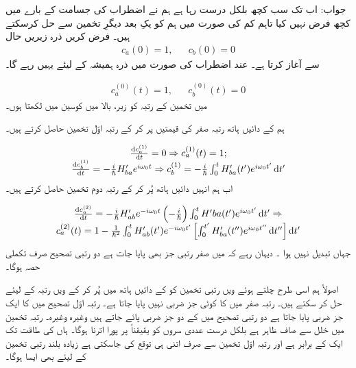 جواب:  
اب تک سب کچھ بلکل درست رہا ہے ہم نے اضطراب کی جسامت کے بارے میں کچھ فرض نہیں کیا تاہم کم  کی صورت میں ہم  کو یکِ بعد دیگرِ تخمین سے حل کرسکتے ہیں۔ فرض کریں ذرہ زیریں حال
\begin{align}
	c_a(0)=1,&&c_b(0)=0
\end{align}
سے آغاز کرتا ہے۔ عند اضطراب کی صورت میں ذرہ ہمیشہ کے لیئے یہیں رہے گا۔

\begin{align}
	c^{(0)}_a(t)=1,&&c_b^{(0)}(t)=0
\end{align}
میں تخمین کے رتبہ کو زیر، بالا میں کوسین میں لکھتا ہوں۔

ہم  کے دائیں ہاتھ رتبہ صفر کی قیمتیں پر کر کے رتبہ اوّل تخمین حاصل کرتے ہیں۔

\begin{align}
	\begin{matrix}
		\frac{\dif c_a^{(1)}}{\dif t}=0\Rightarrow c_a^{(1)}(t)=1; \\
		\frac{\dif c_b^{(1)}}{\dif t}=-\frac{i}{\hslash}H'_{ba}e^{i\omega_0t}\Rightarrow c_b^{(1)}=-\frac{i}{\hslash}\int_{0}^{t}H'_{ba}(t')e^{i\omega_0t'}\dif t'
	\end{matrix} 
\end{align}
اب ہم انہیں دائیں ہاتھ پُر کر کے رتبہ دوم تخمین حاصل کرتے ہیں۔

\begin{align}
	\begin{matrix}
		\frac{\dif c_a^{(2)}}{\dif t}=-\frac{i}{\hslash}H'_{ab}e^{-i\omega_0t}\left(-\frac{i}{\hslash}\right)\int_{0}^{t}H'{ba}(t')e^{i\omega_0t'}\dif t'\Rightarrow \\
		c_a^{(2)}(t)=1-\frac{1}{\hslash^2}\int_{0}^{t}H'_{ab}(t')e^{-i\omega_0t'}\left[\int_{0}^{t'}H'_{ba}(t'')e^{i\omega_0t''}\dif t''\right]\dif t'
	\end{matrix}
\end{align}
جہاں  تبدیل نہیں ہوا ۔ دیہان رہے کہ  میں صفر رتبی جز بھی پایا جات ہے دو رتبی تصحیح صرف تکملی حصہ ہوگا۔

اصولاً ہم اسی طرح چلتے ہوئے ویں رتبی تخمین کو  کے دائیں ہاتھ میں پُر کر کے ویں رتبہ کے لیئے حل کر سکتے ہیں۔ رتبہ صفر میں  کا کوئی جز ضربی نہیں پایا جاتا ہے۔ رتبہ اوّل تصحیح میں  کا ایک جز ضربی پایا جاتا ہے دو رتبی تصحیح میں  کے دو جز ضربی پائے جاتے ہیں وغیرہ وغیرہ۔ رتبہ تخمین میں خلل  سے صاف ظاہر ہے بلکل درست عددی سروں کو یقیقناً  پر پورا اترنا ہوگا۔ ہاں  کی طاقت  تک  ایک کے برابر ہے اور رتبہ اوّل تخمین سے صرف اتنی ہی توقع کی جاسکتی ہے زیادہ بلند رتبی تخمین کے لیئے بھی ایسا ہوگا۔

